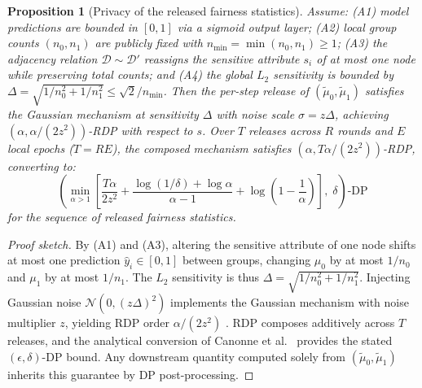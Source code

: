 \documentclass[pdflatex,sn-mathphys-num]{sn-jnl}
\theoremstyle{thmstyleone}%
\newtheorem{proposition}[theorem]{Proposition}%
\theoremstyle{thmstyletwo}%
\theoremstyle{thmstylethree}%
\begin{document}
\begin{proposition}[Privacy of the released fairness statistics]
\label{prop:ftgd_privacy}
Assume: (A1) model predictions are bounded in $[0, 1]$ via a sigmoid output layer; 
(A2) local group counts $(n_0, n_1)$ are publicly fixed with $n_{\min} = \min(n_0, n_1) \ge 1$; 
(A3) the adjacency relation $\mathcal{D} \sim \mathcal{D}'$ reassigns the sensitive attribute $s_i$ of at most one node while preserving total counts; and 
(A4) the global $L_2$ sensitivity is bounded by $\Delta = \sqrt{1/n_0^2 + 1/n_1^2} \le \sqrt{2}/n_{\min}$. 
Then the per-step release of $(\tilde{\mu}_0, \tilde{\mu}_1)$ satisfies the Gaussian mechanism at sensitivity $\Delta$ with noise scale $\sigma = z\Delta$, achieving $(\alpha, \alpha / (2z^2))$-RDP with respect to $s$. Over $T$ releases across $R$ rounds and $E$ local epochs ($T = RE$), the composed mechanism satisfies $(\alpha, T\alpha / (2z^2))$-RDP, converting to:
\begin{equation}
\left(\min_{\alpha > 1} \left[ \frac{T\alpha}{2z^2} + \frac{\log(1/\delta) + \log \alpha}{\alpha - 1} + \log\left(1 - \frac{1}{\alpha}\right) \right],\; \delta \right)\text{-DP}
\end{equation}
for the sequence of released fairness statistics.
\end{proposition}
\begin{proof}[Proof sketch]
By (A1) and (A3), altering the sensitive attribute of one node shifts at most one prediction $\hat{y}_i \in [0, 1]$ between groups, changing $\mu_0$ by at most $1/n_0$ and $\mu_1$ by at most $1/n_1$. The $L_2$ sensitivity is thus $\Delta = \sqrt{1/n_0^2 + 1/n_1^2}$. Injecting Gaussian noise $\mathcal{N}(0, (z\Delta)^2)$ implements the Gaussian mechanism with noise multiplier $z$, yielding RDP order $\alpha / (2z^2)$ \cite{mironov2017renyi}. RDP composes additively across $T$ releases, and the analytical conversion of Canonne et al.~\cite{canonne2020discrete} provides the stated $(\epsilon, \delta)$-DP bound. Any downstream quantity computed solely from $(\tilde{\mu}_0, \tilde{\mu}_1)$ inherits this guarantee by DP post-processing.
\end{proof}
\end{document}
